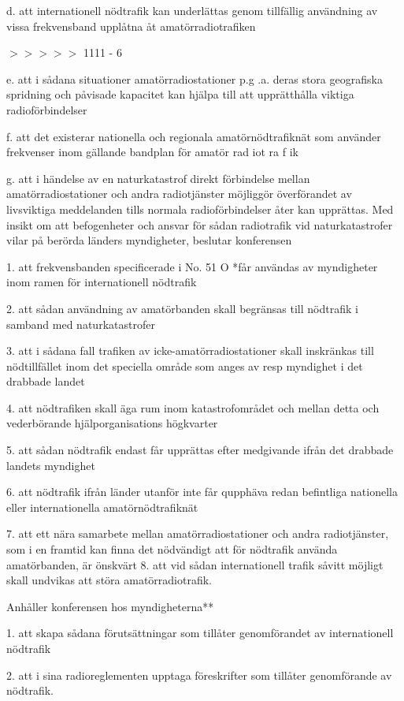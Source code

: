 d. att internationell nödtrafik kan underlättas genom tillfällig användning av
vissa frekvensband upplåtna åt amatörradiotrafiken

$>>>>>$ 1111 - 6

e. att i sådana situationer amatörradiostationer p.g .a. deras stora geografiska
spridning och påvisade kapacitet kan hjälpa till att upprätthålla viktiga
radioförbindelser

f. att det existerar nationella och regionala amatörnödtrafiknät som använder
frekvenser inom gällande bandplan för amatör rad iot ra f ik

g. att i händelse av en naturkatastrof direkt förbindelse mellan
amatörradiostationer och andra radiotjänster möjliggör överförandet av
livsviktiga meddelanden tills normala radioförbindelser åter kan upprättas.  Med
insikt om att befogenheter och ansvar för sådan radiotrafik vid naturkatastrofer
vilar på berörda länders myndigheter, beslutar konferensen

1. att frekvensbanden specificerade i No.  51 O *får användas av myndigheter
inom ramen för internationell nödtrafik

2. att sådan användning av amatörbanden skall begränsas till nödtrafik i samband
med naturkatastrofer

3. att i sådana fall trafiken av icke-amatörradiostationer skall inskränkas till
nödtillfället inom det speciella område som anges av resp myndighet i det
drabbade landet

4. att nödtrafiken skall äga rum inom katastrofområdet och mellan detta och
vederbörande hjälporganisations högkvarter

5. att sådan nödtrafik endast får upprättas efter medgivande ifrån det drabbade
landets myndighet

6. att nödtrafik ifrån länder utanför inte får qupphäva redan befintliga
nationella eller internationella amatörnödtrafiknät

7. att ett nära samarbete mellan amatörradiostationer och andra radiotjänster,
som i en framtid kan finna det nödvändigt att för nödtrafik använda
amatörbanden, är önskvärt 8. att vid sådan internationell trafik såvitt möjligt
skall undvikas att störa amatörradiotrafik.

Anhåller konferensen hos myndigheterna**

1. att skapa sådana förutsättningar som tillåter genomförandet av internationell
nödtrafik

2. att i sina radioreglementen upptaga föreskrifter som tillåter genomförande av
nödtrafik.

